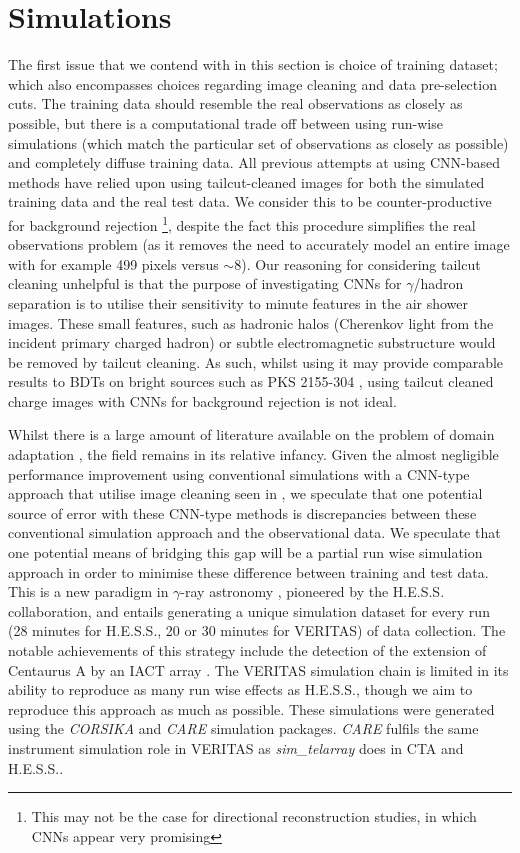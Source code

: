 \section{Simulations}
The first issue that we contend with in this section is choice of training dataset; which also encompasses choices regarding image cleaning and data pre-selection cuts. The training data should resemble the real observations as closely as possible, but there is a computational trade off between using run-wise simulations (which match the particular set of observations as closely as possible) and completely diffuse training data. All previous attempts at using CNN-based methods have relied upon using tailcut-cleaned images \cite{Shilon} for both the simulated training data and the real test data. We consider this to be counter-productive for background rejection \footnote{This may not be the case for directional reconstruction studies, in which CNNs appear very promising}, despite the fact this procedure simplifies the real observations problem (as it removes the need to accurately model an entire image with for example 499 pixels versus $\sim$8). Our reasoning for considering tailcut cleaning unhelpful is that the purpose of investigating CNNs for $\gamma$/hadron separation is to utilise their sensitivity to minute features in the air shower images. These small features, such as hadronic halos \cite{model++} (Cherenkov light from the incident primary charged hadron) or subtle electromagnetic substructure would be removed by tailcut cleaning. As such, whilst using it may provide comparable results to BDTs on bright sources such as PKS 2155-304 \cite{Shilon}, using tailcut cleaned charge images with CNNs for background rejection is not ideal.

Whilst there is a large amount of literature available on the problem of domain adaptation \cite{ada}, the field remains in its relative infancy. Given the almost negligible performance improvement using conventional simulations with a CNN-type approach that utilise image cleaning seen in \cite{Shilon,ParsonsOhm}, we speculate that one potential source of error with these CNN-type methods is discrepancies between these conventional simulation approach and the observational data. We speculate that one potential means of bridging this gap will be a partial run wise simulation approach in order to minimise these difference between training and test data. This is a new paradigm in $\gamma$-ray astronomy \cite{rws}, pioneered by the H.E.S.S. collaboration, and entails generating a unique simulation dataset for every run (28 minutes for H.E.S.S., 20 or 30 minutes for VERITAS) of data collection. The notable achievements of this strategy include the detection of the extension of Centaurus A by an IACT array \cite{cena}. The VERITAS simulation chain is limited in its ability to reproduce as many run wise effects as H.E.S.S., though we aim to reproduce this approach as much as possible. These simulations were generated using the \textit{CORSIKA} and \textit{CARE} \cite{CARE} simulation packages. \textit{CARE} fulfils the same instrument simulation role in VERITAS as \textit{sim\_telarray} does in CTA and H.E.S.S..

